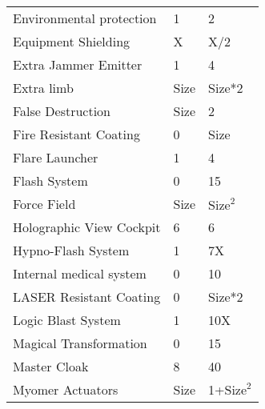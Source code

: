 \documentclass[twoside]{book}
\begin{document}
\begin{longtable}{p{1.25in}ll}
  \raggedright
           Environmental protection
           
  &
   1 
  &
   2 
  \tabularnewline
      
  \raggedright
           Equipment Shielding 
  &
   X 
  &
   X/2 
  \tabularnewline
      
  \raggedright
           Extra Jammer Emitter 
  &
   1 
  &
   4 
  \tabularnewline
      
  \raggedright
           Extra limb 
  &
   Size 
  &
   Size*2 
  \tabularnewline
      
  \raggedright
           False Destruction 
  &
   Size 
  &
   2 
  \tabularnewline
      
  \raggedright
           Fire Resistant Coating 
  &
   0 
  &
   Size 
  \tabularnewline
      
  \raggedright
           Flare Launcher 
  &
   1 
  &
   4 
  \tabularnewline
      
  \raggedright
           Flash System 
  &
   0 
  &
   15 
  \tabularnewline
      
  \raggedright
           Force Field 
  &
   Size 
  &
   \begin{math}{\textrm{Size}}^{2}\end{math} 
  \tabularnewline
      
  \raggedright
           Holographic View Cockpit
           
  &
   6 
  &
   6 
  \tabularnewline
      
  \raggedright
           Hypno-Flash System 
  &
   1 
  &
   7X 
  \tabularnewline
      
  \raggedright
           Internal medical system
           
  &
   0 
  &
   10 
  \tabularnewline
      
  \raggedright
           LASER Resistant Coating
           
  &
   0 
  &
   Size*2 
  \tabularnewline
      
  \raggedright
           Logic Blast System 
  &
   1 
  &
   10X 
  \tabularnewline
      
  \raggedright
           Magical Transformation 
  &
   0 
  &
   15 
  \tabularnewline
      
  \raggedright
           Master Cloak 
  &
   8 
  &
   40 
  \tabularnewline
      
  \raggedright
           Myomer Actuators 
  &
   Size 
  &
   1+\begin{math}{\textrm{Size}}^{2}\end{math} 
  \tabularnewline
      

\end{longtable}
\end{document}
